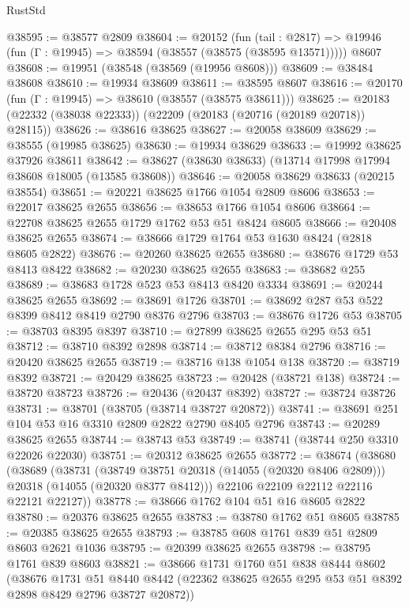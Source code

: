 \begin{lexlean}{RustStd}
\begin{coremodule}
@38595 := @38577 @2809
@38604 := @20152
    (fun (tail : @2817) => @19946 (fun (Γ : @19945) => @38594 (@38557 (@38575 (@38595 @13571)))))
    @8607
@38608 := @19951 (@38548 (@38569 (@19956 @8608)))
@38609 := @38484 @38608
@38610 := @19934 @38609
@38611 := @38595 @8607
@38616 := @20170 (fun (Γ : @19945) => @38610 (@38557 (@38575 @38611)))
@38625 := @20183 (@22332 (@38038 @22333)) (@22209 (@20183 (@20716 (@20189 @20718)) @28115))
@38626 := @38616 @38625
@38627 := @20058 @38609
@38629 := @38555 (@19985 @38625)
@38630 := @19934 @38629
@38633 := @19992 @38625 @37926 @38611
@38642 := @38627 (@38630 @38633) (@13714 @17998 @17994 @38608 @18005 (@13585 @38608))
@38646 := @20058 @38629 @38633 (@20215 @38554)
@38651 := @20221 @38625 @1766 @1054 @2809 @8606
@38653 := @22017 @38625 @2655
@38656 := @38653 @1766 @1054 @8606
@38664 := @22708 @38625 @2655 @1729 @1762 @53 @51 @8424 @8605
@38666 := @20408 @38625 @2655
@38674 := @38666 @1729 @1764 @53 @1630 @8424 (@2818 @8605 @2822)
@38676 := @20260 @38625 @2655
@38680 := @38676 @1729 @53 @8413 @8422
@38682 := @20230 @38625 @2655
@38683 := @38682 @255
@38689 := @38683 @1728 @523 @53 @8413 @8420 @3334
@38691 := @20244 @38625 @2655
@38692 := @38691 @1726
@38701 := @38692 @287 @53 @522 @8399 @8412 @8419 @2790 @8376 @2796
@38703 := @38676 @1726 @53
@38705 := @38703 @8395 @8397
@38710 := @27899 @38625 @2655 @295 @53 @51
@38712 := @38710 @8392 @2898
@38714 := @38712 @8384 @2796
@38716 := @20420 @38625 @2655
@38719 := @38716 @138 @1054 @138
@38720 := @38719 @8392
@38721 := @20429 @38625
@38723 := @20428 (@38721 @138)
@38724 := @38720 @38723
@38726 := @20436 (@20437 @8392)
@38727 := @38724 @38726
@38731 := @38701 (@38705 (@38714 @38727 @20872))
@38741 := @38691 @251 @104 @53 @16 @3310 @2809 @2822 @2790 @8405 @2796
@38743 := @20289 @38625 @2655
@38744 := @38743 @53
@38749 := @38741 (@38744 @250 @3310 @22026 @22030)
@38751 := @20312 @38625 @2655
@38772 := @38674
    (@38680
      (@38689
        (@38731
          (@38749 @38751 @20318 (@14055 (@20320 @8406 @2809)))
          @20318
          (@14055 (@20320 @8377 @8412)))
        @22106
        @22109
        @22112
        @22116
        @22121
        @22127))
@38778 := @38666 @1762 @104 @51 @16 @8605 @2822
@38780 := @20376 @38625 @2655
@38783 := @38780 @1762 @51 @8605
@38785 := @20385 @38625 @2655
@38793 := @38785 @608 @1761 @839 @51 @2809 @8603 @2621 @1036
@38795 := @20399 @38625 @2655
@38798 := @38795 @1761 @839 @8603
@38821 := @38666
    @1731
    @1760
    @51
    @838
    @8444
    @8602
    (@38676
      @1731
      @51
      @8440
      @8442
      (@22362 @38625 @2655 @295 @53 @51 @8392 @2898 @8429 @2796 @38727 @20872))

\end{coremodule}
\end{lexlean}
